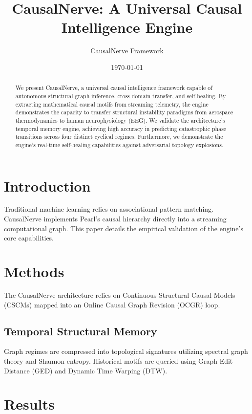 \documentclass{article}
\title{CausalNerve: A Universal Causal Intelligence Engine}
\author{CausalNerve Framework}
\date{\today}
\begin{document}
\maketitle

\begin{abstract}
We present CausalNerve, a universal causal intelligence framework capable of autonomous structural graph inference, cross-domain transfer, and self-healing. By extracting mathematical causal motifs from streaming telemetry, the engine demonstrates the capacity to transfer structural instability paradigms from aerospace thermodynamics to human neurophysiology (EEG). We validate the architecture's temporal memory engine, achieving high accuracy in predicting catastrophic phase transitions across four distinct cyclical regimes. Furthermore, we demonstrate the engine's real-time self-healing capabilities against adversarial topology explosions.
\end{abstract}

\section{Introduction}
Traditional machine learning relies on associational pattern matching. CausalNerve implements Pearl's causal hierarchy directly into a streaming computational graph. This paper details the empirical validation of the engine's core capabilities.

\section{Methods}
The CausalNerve architecture relies on Continuous Structural Causal Models (CSCMs) mapped into an Online Causal Graph Revision (OCGR) loop. 

\subsection{Temporal Structural Memory}
Graph regimes are compressed into topological signatures utilizing spectral graph theory and Shannon entropy. Historical motifs are queried using Graph Edit Distance (GED) and Dynamic Time Warping (DTW).

\section{Results}
\end{document}
